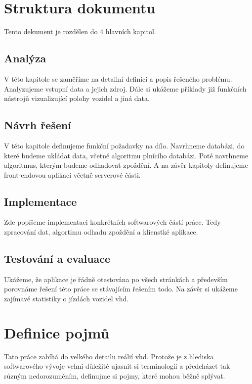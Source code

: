 \section*{Struktura dokumentu}

Tento dekument je rozdělen do 4 hlavních kapitol.

\subsection*{Analýza}

V této kapitole se zaměříme na detailní definici a popis řešeného problému. Analyzujeme vstupní data a jejich zdroj. Dále si ukážeme příklady již funkčních nástrojů vizualizující polohy vozidel a jiná data.

\subsection*{Návrh řešení}

V této kapitole definujeme funkční požadavky na dílo. Navrhneme databázi, do které budeme ukládat data, včetně algoritmu plnícího databázi. Poté navrhneme algoritmus, kterým budeme odhadovat zpoždění. A na závěr kapitoly definujeme front-endovou aplikaci včetně serverové části.

\subsection*{Implementace}

Zde popíšeme implementaci konkrétních softwarových částí práce. Tedy zpracování dat, algortimu odhadu zpoždění a klienstké aplikace.

\subsection*{Testování a evaluace}

Ukážeme, že aplikace je řádně otestována po všech stránkách a především porovnáme řešení této práce se stávajícím řešením todo. Na závěr si ukážeme zajímavé statistiky o jízdách vozidel \gls{vhd}.

\section*{Definice pojmů}

Tato práce zabíhá do velkého detailu reálií \gls{vhd}. Protože je z hlediska softwarového vývoje velmi důležité ujasnit si terminologii a předcházet tak různým nedorozuměním, definujme si pojmy, které mohou běžně splývat.

